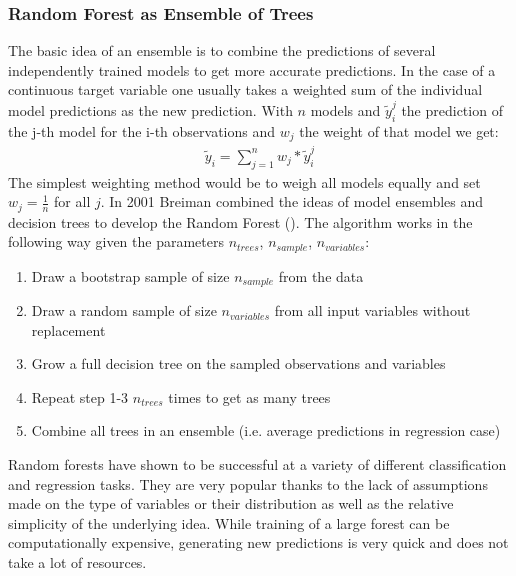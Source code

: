 \subsubsection{Random Forest as Ensemble of Trees}
The basic idea of an ensemble is to combine the predictions of several independently trained models to get more accurate predictions. In the case of a continuous target variable one usually takes a weighted sum of the individual model predictions as the new prediction. With $n$ models and $\tilde{y}_i^j$ the prediction of the j-th model for the i-th observations and $w_j$ the weight of that model we get:
\begin{align}
\tilde{y}_i = \sum_{j = 1}^n w_j * \tilde{y}_i^j
\end{align}
The simplest weighting method would be to weigh all models equally and set $w_j = \frac{1}{n}$ for all $j$. In 2001 Breiman combined the ideas of model ensembles and decision trees to develop the Random Forest (\cite{breiman_random_2001}). The algorithm works in the following way given the parameters $n_{trees}$, $n_{sample}$, $n_{variables}$:
\begin{enumerate}
\item Draw a bootstrap sample of size $n_{sample}$ from the data
\item Draw a random sample of size $n_{variables}$ from all input variables without replacement
\item Grow a full decision tree on the sampled observations and variables
\item Repeat step 1-3 $n_{trees}$ times to get as many trees
\item Combine all trees in an ensemble (i.e. average predictions in regression case)
\end{enumerate}
Random forests have shown to be successful at a variety of different classification and regression tasks. They are very popular thanks to the lack of assumptions made on the type of variables or their distribution as well as the relative simplicity of the underlying idea. While training of a large forest can be computationally expensive, generating new predictions is very quick and does not take a lot of resources.
